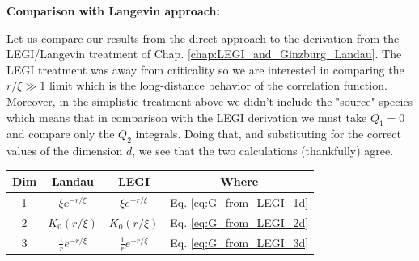 \documentclass[onecolumn,fleqn,12pt,openany]{book}
\begin{document}
\textbf{Comparison with Langevin approach:}

Let us compare our results from the direct approach to the derivation from the LEGI/Langevin treatment of Chap. \ref{chap:LEGI_and_Ginzburg_Landau}. The LEGI treatment was away from criticality so we are interested in comparing the $r/\xi \gg 1$ limit which is the long-distance behavior of the correlation function. Moreover, in the simplistic treatment above we didn't include the "source" species which means that in comparison with the LEGI derivation we must take $Q_1=0$ and compare only the $Q_2$ integrals. Doing that, and substituting for the correct values of the dimension $d$, we see that the two calculations (thankfully) agree.

\vspace{0.5cm}

\begin{tabular}{|c|c|c|c|}
\hline
Dim & Landau 			& LEGI 				& Where \\
\hline
1  	& $\xi e^{-r/\xi}$		& $\xi e^{-r/\xi}$		& Eq. \ref{eq:G_from_LEGI_1d} \\
2  	& $K_0(r/\xi)$			& $K_0(r/\xi)$	     	& Eq. \ref{eq:G_from_LEGI_2d} \\
3 & $\frac{1}{r}e^{-r/\xi}$ &	$\frac{1}{r}e^{-r/\xi}$	& Eq. \ref{eq:G_from_LEGI_3d} \\		
\hline
\end{tabular} 
\end{document}
